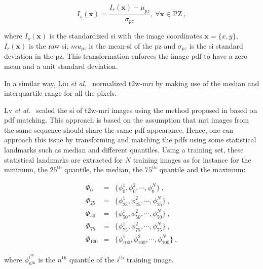 \begin{enumerate}[leftmargin=*]
\begin{equation}
	I_s(\mathbf{x}) = \frac{ I_r(\mathbf{x}) - \mu_{pz}}{\sigma_{pz}}, \ \forall \mathbf{x} \in \text{PZ} \ ,
	\label{eq:meansta}
\end{equation}

\noindent where $I_s(\mathbf{x})$ is the standardized \ac{si} with the image coordinates $\mathbf{x} = \{x,y\}$, $I_r(\mathbf{x})$ is the raw \ac{si}, $mu_{pz}$ is the mean-\ac{si} of the \ac{pz} and $\sigma_{pz}$ is the \ac{si} standard deviation in the \ac{pz}.
This transformation enforces the image \ac{pdf} to have a zero mean and a unit standard deviation.

In a similar way, Liu \textit{et al.}~\cite{Liu2013} normalized \ac{t2w}-\ac{mri} by making use of the median and interquartile range for all the pixels.

Lv \textit{et al.}~\cite{Lv2009} scaled the \ac{si} of \ac{t2w}-\ac{mri} images using the method proposed in \cite{Nyul2000} based on \ac{pdf} matching.
This approach is based on the assumption that \ac{mri} images from the same sequence should share the same \ac{pdf} appearance.
Hence, one can approach this issue by transforming and matching the \acp{pdf} using some statistical landmarks such as median and different quantiles.
Using a training set, these statistical landmarks are extracted for $N$ training images as for instance for the minimum, the $25^{\text{th}}$ quantile, the median, the $75^{\text{th}}$ quantile and the maximum:

\begin{eqnarray}	
	\Phi_{0} & = & \{ \phi_{0}^{1}, \phi_{0}^{2}, \cdots, \phi_{0}^{N} \} \ , \nonumber \\
	\Phi_{25} & = & \{ \phi_{25}^{1}, \phi_{25}^{2}, \cdots, \phi_{25}^{N} \} \ , \nonumber \\
	\Phi_{50} & = & \{ \phi_{50}^{1}, \phi_{50}^{2}, \cdots, \phi_{50}^{N} \} \ ,  \label{eq:quantileStd} \\
	\Phi_{75} & = & \{ \phi_{75}^{1}, \phi_{75}^{2}, \cdots, \phi_{75}^{N} \} \ , \nonumber \\
	\Phi_{100} & = & \{ \phi_{100}^{1}, \phi_{100}^{2}, \cdots, \phi_{100}^{N} \} \ , \nonumber
\end{eqnarray}

\noindent where $\phi_{n^\text{th}}^{i^{\text{th}}}$ is the $n^{\text{th}}$ quantile of the $i^{\text{th}}$ training image.


\end{enumerate}

